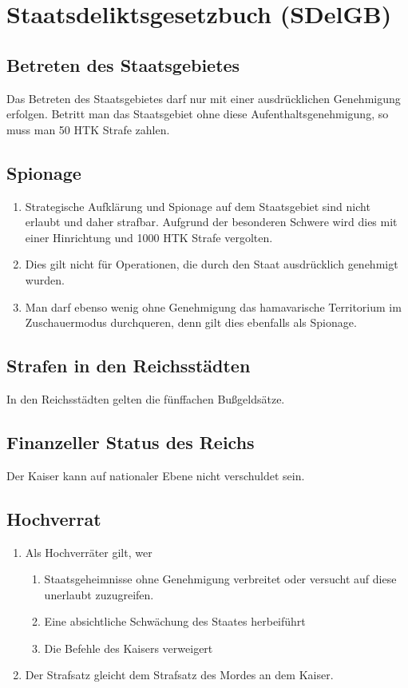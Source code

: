 \documentclass{article}
\begin{document}
\newpage
\section{Staatsdeliktsgesetzbuch (SDelGB)}
\localtableofcontents

\subsection{Betreten des Staatsgebietes}
Das Betreten des Staatsgebietes darf nur mit einer ausdrücklichen Genehmigung erfolgen. Betritt man das Staatsgebiet ohne diese Aufenthaltsgenehmigung, so muss man 50 HTK Strafe zahlen.

\subsection{Spionage}
\begin{enumerate}[(1)]
    \item Strategische Aufklärung und Spionage auf dem Staatsgebiet sind nicht erlaubt und daher strafbar. Aufgrund der besonderen Schwere wird dies mit einer Hinrichtung und 1000 HTK Strafe vergolten.
    \item Dies gilt nicht für Operationen, die durch den Staat ausdrücklich genehmigt wurden. 
    \item Man darf ebenso wenig ohne Genehmigung das hamavarische Territorium im Zuschauermodus durchqueren, denn gilt dies ebenfalls als Spionage.    
\end{enumerate}

\subsection{Strafen in den Reichsstädten}
In den Reichsstädten gelten die fünffachen Bußgeldsätze.

\subsection{Finanzeller Status des Reichs}
Der Kaiser kann auf nationaler Ebene nicht verschuldet sein.

\subsection{Hochverrat}
\begin{enumerate}[(1)]
    \item Als Hochverräter gilt, wer
    \begin{enumerate}[1.]
        \item Staatsgeheimnisse ohne Genehmigung verbreitet oder versucht auf diese unerlaubt zuzugreifen.
        \item Eine absichtliche Schwächung des Staates herbeiführt
        \item Die Befehle des Kaisers verweigert
    \end{enumerate}
    \item Der Strafsatz gleicht dem Strafsatz des Mordes an dem Kaiser.
\end{enumerate}
\end{document}
